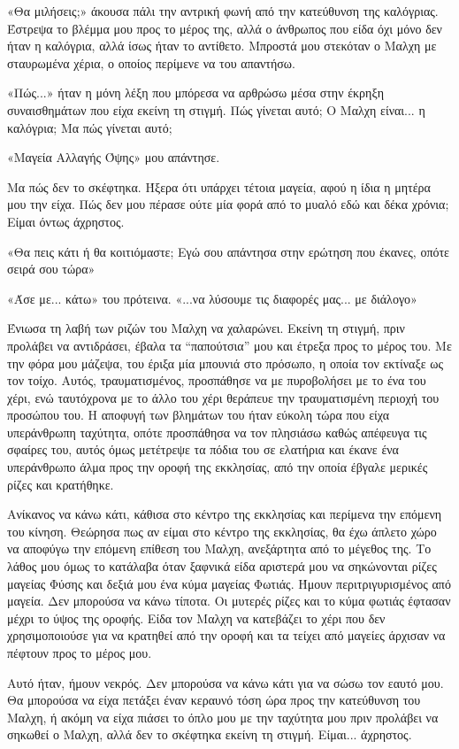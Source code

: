 \documentclass[12pt,twoside, openany]{book}
\begin{document}
«Θα μιλήσεις;» άκουσα πάλι την αντρική φωνή από την κατεύθυνση της καλόγριας. Έστρεψα το βλέμμα μου προς το μέρος της, αλλά ο άνθρωπος που είδα όχι μόνο δεν ήταν η καλόγρια, αλλά ίσως ήταν το αντίθετο. Μπροστά μου στεκόταν ο Μαλχη με σταυρωμένα χέρια, ο οποίος περίμενε να του απαντήσω.

«Πώς...» ήταν η μόνη λέξη που μπόρεσα να αρθρώσω μέσα στην έκρηξη συναισθημάτων που είχα εκείνη τη στιγμή. Πώς γίνεται αυτό; Ο Μαλχη είναι... η καλόγρια; Μα πώς γίνεται αυτό;

«Μαγεία Αλλαγής Όψης» μου απάντησε.

Μα πώς δεν το σκέφτηκα. Ήξερα ότι υπάρχει τέτοια μαγεία, αφού η ίδια η μητέρα μου την είχα. Πώς δεν μου πέρασε ούτε μία φορά από το μυαλό εδώ και δέκα χρόνια; Είμαι όντως άχρηστος.

«Θα πεις κάτι ή θα κοιτιόμαστε; Εγώ σου απάντησα στην ερώτηση που έκανες, οπότε σειρά σου τώρα»

«Άσε με... κάτω» του πρότεινα. «...να λύσουμε τις διαφορές μας... με διάλογο»

Ένιωσα τη λαβή των ριζών του Μαλχη να χαλαρώνει. Εκείνη τη στιγμή, πριν προλάβει να αντιδράσει, έβαλα τα “παπούτσια” μου και έτρεξα προς το μέρος του. Με την φόρα μου μάζεψα, του έριξα μία μπουνιά στο πρόσωπο, η οποία τον εκτίναξε ως τον τοίχο. Αυτός, τραυματισμένος, προσπάθησε να με πυροβολήσει με το ένα του χέρι, ενώ ταυτόχρονα με το άλλο του χέρι θεράπευε την τραυματισμένη περιοχή του προσώπου του. Η αποφυγή των βλημάτων του ήταν εύκολη τώρα που είχα υπεράνθρωπη ταχύτητα, οπότε προσπάθησα να τον πλησιάσω καθώς απέφευγα τις σφαίρες του, αυτός όμως μετέτρεψε τα πόδια του σε ελατήρια και έκανε ένα υπεράνθρωπο άλμα προς την οροφή της εκκλησίας, από την οποία έβγαλε μερικές ρίζες και κρατήθηκε.

Ανίκανος να κάνω κάτι, κάθισα στο κέντρο της εκκλησίας και περίμενα την επόμενη του κίνηση. Θεώρησα πως αν είμαι στο κέντρο της εκκλησίας, θα έχω άπλετο χώρο να αποφύγω την επόμενη επίθεση του Μαλχη, ανεξάρτητα από το μέγεθος της. Το λάθος μου όμως το κατάλαβα όταν ξαφνικά είδα αριστερά μου να σηκώνονται ρίζες μαγείας Φύσης και δεξιά μου ένα κύμα μαγείας Φωτιάς. Ήμουν περιτριγυρισμένος από μαγεία. Δεν μπορούσα να κάνω τίποτα. Οι μυτερές ρίζες και το κύμα φωτιάς έφτασαν μέχρι το ύψος της οροφής. Είδα τον Μαλχη να κατεβάζει το χέρι που δεν χρησιμοποιούσε για να κρατηθεί από την οροφή και τα τείχει από μαγείες άρχισαν να πέφτουν προς το μέρος μου. 

Αυτό ήταν, ήμουν νεκρός. Δεν μπορούσα να κάνω κάτι για να σώσω τον εαυτό μου. Θα μπορούσα να είχα πετάξει έναν κεραυνό τόση ώρα προς την κατεύθυνση του Μαλχη, ή ακόμη να είχα πιάσει το όπλο μου με την ταχύτητα μου πριν προλάβει να σηκωθεί ο Μαλχη, αλλά δεν το σκέφτηκα εκείνη τη στιγμή. Είμαι... άχρηστος.
\end{document}
